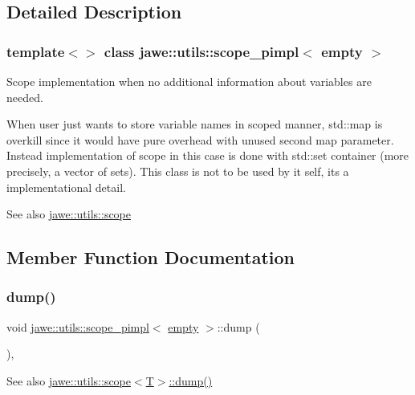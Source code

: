\subsection{Detailed Description}
\subsubsection*{template$<$$>$\newline
class jawe\+::utils\+::scope\+\_\+pimpl$<$ empty $>$}

Scope implementation when no additional information about variables are needed. 

When user just wants to store variable names in scoped manner, std\+::map is overkill since it would have pure overhead with unused second map parameter. Instead implementation of scope in this case is done with std\+::set container (more precisely, a vector of sets). This class is not to be used by it self, it\textquotesingle{}s a implementational detail.

\begin{DoxySeeAlso}{See also}
\hyperlink{classjawe_1_1utils_1_1scope}{jawe\+::utils\+::scope} 
\end{DoxySeeAlso}


\subsection{Member Function Documentation}
\mbox{\label{classjawe_1_1utils_1_1scope__pimpl_3_01empty_01_4_aead3f87985117e0e8a7214a7c719b410}} 
\subsubsection{\texorpdfstring{dump()}{dump()}}
{\footnotesize\ttfamily void \hyperlink{classjawe_1_1utils_1_1scope__pimpl}{jawe\+::utils\+::scope\+\_\+pimpl}$<$ \hyperlink{classjawe_1_1utils_1_1empty}{empty} $>$\+::dump (\begin{DoxyParamCaption}{ }\end{DoxyParamCaption})\hspace{0.3cm}{\ttfamily [inline]}, {\ttfamily [private]}}

\begin{DoxySeeAlso}{See also}
\hyperlink{classjawe_1_1utils_1_1scope_a97240fdcdf9b05029449ba0f652c3417}{jawe\+::utils\+::scope$<$\+T$>$\+::dump()} 
\end{DoxySeeAlso}
\mbox{\label{classjawe_1_1utils_1_1scope__pimpl_3_01empty_01_4_afceb49bc52fb07097987a3a8ac527fb1}} 
